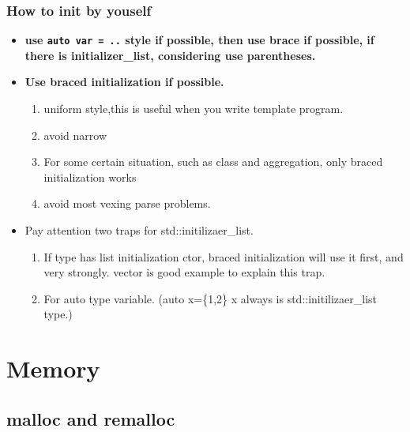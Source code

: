 \documentclass[a4paper,11pt,twoside]{book}
\begin{document}
\subsection{How to init by youself}
\begin{itemize}

	\item \textbf{use \texttt{auto var = ..} style if possible, then use brace if possible, if there is initializer\_list, considering use parentheses.}

	\item \textbf{Use braced initialization if possible.}
	\begin{enumerate}
		\item uniform style,this is useful when you write template program.
		\item avoid narrow
		\item  For some certain situation, such as class and aggregation, only braced initialization works
		\item avoid most vexing parse problems.
	\end{enumerate}

	\item Pay attention two traps for std::initilizaer\_list. 
	\begin{enumerate}
		\item If type has list initialization ctor, braced initialization will use it first, and very strongly. vector is good example to explain this trap.
		\item For auto type variable. (auto x=\{1,2\} x always is std::initilizaer\_list type.)
	\end{enumerate}
\end{itemize}

\chapter{Memory}

\section{malloc and remalloc}
\end{document}
